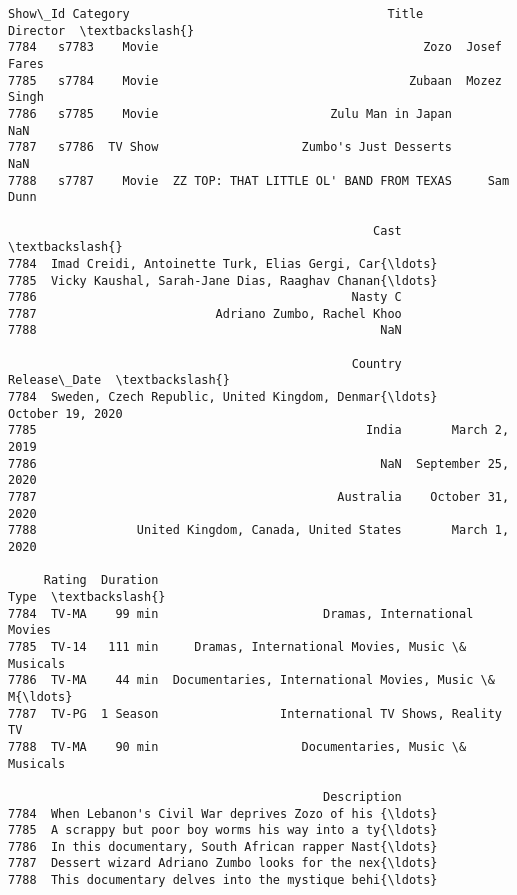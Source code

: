 \documentclass[11pt]{article}
\makeatletter
\newcommand{\boxspacing}{\kern\kvtcb@left@rule\kern\kvtcb@boxsep}
\newcommand{\prompt}[4]{
        {\ttfamily\llap{{\color{#2}[#3]:\hspace{3pt}#4}}\vspace{-\baselineskip}}
    }
\makeatother
\begin{document}
            \begin{tcolorbox}[breakable, size=fbox, boxrule=.5pt, pad at break*=1mm, opacityfill=0]
\prompt{Out}{outcolor}{6}{\boxspacing}
\begin{Verbatim}[commandchars=\\\{\}]
     Show\_Id Category                                    Title     Director  \textbackslash{}
7784   s7783    Movie                                     Zozo  Josef Fares
7785   s7784    Movie                                   Zubaan  Mozez Singh
7786   s7785    Movie                        Zulu Man in Japan          NaN
7787   s7786  TV Show                    Zumbo's Just Desserts          NaN
7788   s7787    Movie  ZZ TOP: THAT LITTLE OL' BAND FROM TEXAS     Sam Dunn

                                                   Cast  \textbackslash{}
7784  Imad Creidi, Antoinette Turk, Elias Gergi, Car{\ldots}
7785  Vicky Kaushal, Sarah-Jane Dias, Raaghav Chanan{\ldots}
7786                                            Nasty C
7787                         Adriano Zumbo, Rachel Khoo
7788                                                NaN

                                                Country        Release\_Date  \textbackslash{}
7784  Sweden, Czech Republic, United Kingdom, Denmar{\ldots}    October 19, 2020
7785                                              India       March 2, 2019
7786                                                NaN  September 25, 2020
7787                                          Australia    October 31, 2020
7788              United Kingdom, Canada, United States       March 1, 2020

     Rating  Duration                                               Type  \textbackslash{}
7784  TV-MA    99 min                       Dramas, International Movies
7785  TV-14   111 min     Dramas, International Movies, Music \& Musicals
7786  TV-MA    44 min  Documentaries, International Movies, Music \& M{\ldots}
7787  TV-PG  1 Season                 International TV Shows, Reality TV
7788  TV-MA    90 min                    Documentaries, Music \& Musicals

                                            Description
7784  When Lebanon's Civil War deprives Zozo of his {\ldots}
7785  A scrappy but poor boy worms his way into a ty{\ldots}
7786  In this documentary, South African rapper Nast{\ldots}
7787  Dessert wizard Adriano Zumbo looks for the nex{\ldots}
7788  This documentary delves into the mystique behi{\ldots}
\end{Verbatim}
\end{tcolorbox}
        
\end{document}
